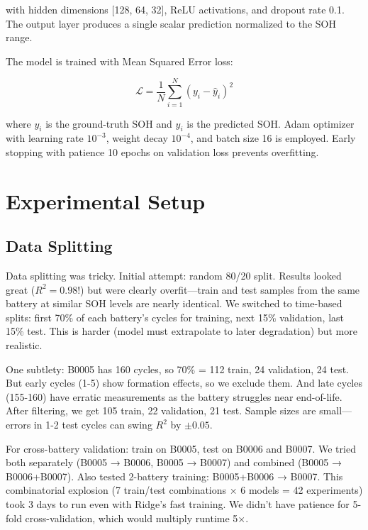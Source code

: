 \documentclass{sn-jnl}
\begin{document}
with hidden dimensions [128, 64, 32], ReLU activations, and dropout rate 0.1. The output layer produces a single scalar prediction normalized to the SOH range.

The model is trained with Mean Squared Error loss:

\begin{equation}
\label{eq:loss}
    \mathcal{L} = \frac{1}{N}\sum_{i=1}^{N}(y_i - \hat{y}_i)^2
\end{equation}

where $y_i$ is the ground-truth SOH and $\hat{y}_i$ is the predicted SOH. Adam optimizer with learning rate $10^{-3}$, weight decay $10^{-4}$, and batch size 16 is employed. Early stopping with patience 10 epochs on validation loss prevents overfitting.

\section{Experimental Setup}
\label{sec:setup}

\subsection{Data Splitting}
\label{subsec:splits}

Data splitting was tricky. Initial attempt: random 80/20 split. Results looked great ($R^2 = 0.98$!) but were clearly overfit—train and test samples from the same battery at similar SOH levels are nearly identical. We switched to time-based splits: first 70\% of each battery's cycles for training, next 15\% validation, last 15\% test. This is harder (model must extrapolate to later degradation) but more realistic.

One subtlety: B0005 has 160 cycles, so 70\% = 112 train, 24 validation, 24 test. But early cycles (1-5) show formation effects, so we exclude them. And late cycles (155-160) have erratic measurements as the battery struggles near end-of-life. After filtering, we get 105 train, 22 validation, 21 test. Sample sizes are small—errors in 1-2 test cycles can swing $R^2$ by $\pm 0.05$.

For cross-battery validation: train on B0005, test on B0006 and B0007. We tried both separately (B0005 → B0006, B0005 → B0007) and combined (B0005 → B0006+B0007). Also tested 2-battery training: B0005+B0006 → B0007. This combinatorial explosion (7 train/test combinations × 6 models = 42 experiments) took 3 days to run even with Ridge's fast training. We didn't have patience for 5-fold cross-validation, which would multiply runtime 5×.
\end{document}
